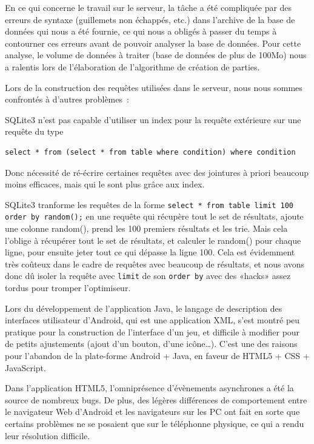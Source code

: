 \documentclass[a4paper,11pt,french]{article}
\def\android{Android\texttrademark{}}
\begin{document}
En ce qui concerne le travail sur le serveur, la tâche a été compliquée par des erreurs de syntaxe (guillemets non échappés, etc.) dans
l'archive de la base de données qui nous a été fournie, ce qui nous a obligés à passer du temps à contourner ces erreurs avant de pouvoir
analyser la base de données. Pour cette analyse, le volume de données à traiter (base de données de plus de 100Mo) nous a ralentis lors de
l'élaboration de l'algorithme de création de parties.

Lors de la construction des requêtes utilisées dans le serveur, nous nous sommes confrontés à d'autres problèmes~:

SQLite3 n'est pas capable d'utiliser un index pour la requête extérieure sur une requête du type
\begin{verbatim}
select * from (select * from table where condition) where condition
\end{verbatim}
Donc nécessité de ré-écrire certaines requêtes avec des jointures à priori beaucoup moins efficaces, mais qui le sont plus grâce aux index.

SQLite3 tranforme les requêtes de la forme \verb!select * from table limit 100 order by random();! en une requête qui récupère tout le set
de résultats, ajoute une colonne random(), prend les 100 premiers résultats et les trie. Mais cela l'oblige à récupérer tout le set de
résultats, et calculer le random() pour chaque ligne, pour ensuite jeter tout ce qui dépasse la ligne 100. Cela est évidemment très coûteux
dans le cadre de requêtes avec beaucoup de résultats, et nous avons donc dû isoler la requête avec \verb!limit! de son \verb!order by! avec
des «hacks» assez tordus pour tromper l'optimiseur.

Lors du développement de l'application Java, le langage de description des interfaces utilisateur d'\android{}, qui est une application XML,
s'est montré peu pratique pour la construction de l'interface d'un jeu, et difficile à modifier pour de petits ajustements (ajout d'un
bouton, d'une icône…). C'est une des raisons pour l'abandon de la plate-forme \android{} + Java, en faveur de HTML5 + CSS + JavaScript.

Dans l'application HTML5, l'omniprésence d'évènements asynchrones a été la source de nombreux bugs. De plus, des légères différences de
comportement entre le navigateur Web d'\android{} et les navigateurs sur les PC ont fait en sorte que certains problèmes ne se posaient que
sur le téléphonne physique, ce qui a rendu leur résolution difficile.
\end{document}
